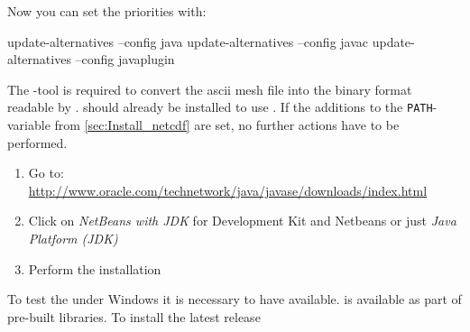 Now you can set the \marktool{\javaname} priorities with:

\begin{code}
update-alternatives --config java
update-alternatives --config javac
update-alternatives --config javaplugin
\end{code}

\levelup{\texorpdfstring{\protect\marktool{\netcdfname{}}}{\netcdfname{}}}

The \marktool{\netcdfname}-tool \marktool{\ncgenname} is required to convert the ascii mesh file into the binary format readable by \marktool{\toolname}. \marktool{\netcdfname} should already be installed to use \marktool{\toolname}. If the additions to the \verb+PATH+-variable from \autoref{sec:Install_netcdf} are set, no further actions have to be performed.



\begin{enumerate}[noitemsep]
 \item Go to: \href{http://www.oracle.com/technetwork/java/javase/downloads/index.html}{http://www.oracle.com/technetwork/java/javase/downloads/index.html}
 \item Click on \textit{NetBeans with JDK} for Development Kit and Netbeans or just \textit{Java Platform (JDK)}
 \item Perform the installation
\end{enumerate}

\levelstay{\texorpdfstring{\protect\marktool{\netcdfname{}}}{\netcdfname{}}}

To test the \marktool{\fetranslatorname} under Windows it is necessary to have \marktool{\ncgenname} available. \marktool{\ncgenname} is available as part of pre-built \marktool{\netcdfname} libraries. To install the latest release

